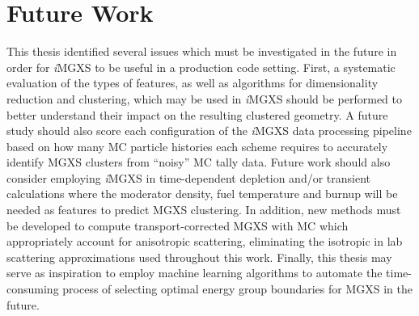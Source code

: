 \documentclass[12pt,twoside]{mitthesis-exec}
\begin{document}
\section*{Future Work}

This thesis identified several issues which must be investigated in the future in order for \textit{i}MGXS to be useful in a production code setting. First, a systematic evaluation of the types of features, as well as algorithms for dimensionality reduction and clustering, which may be used in \textit{i}MGXS should be performed to better understand their impact on the resulting clustered geometry. A future study should also score each configuration of the \textit{i}MGXS data processing pipeline based on how many MC particle histories  each scheme requires to accurately identify MGXS clusters from ``noisy'' MC tally data. Future work should also consider employing \textit{i}MGXS in time-dependent depletion and/or transient calculations where the moderator density, fuel temperature and burnup will be needed as features to predict MGXS clustering. In addition, new methods must be developed to compute transport-corrected MGXS with MC which appropriately account for anisotropic scattering, eliminating the isotropic in lab scattering approximations used throughout this work. Finally, this thesis may serve as inspiration to employ machine learning algorithms to automate the time-consuming process of selecting optimal energy group boundaries for MGXS in the future.


\end{document}
